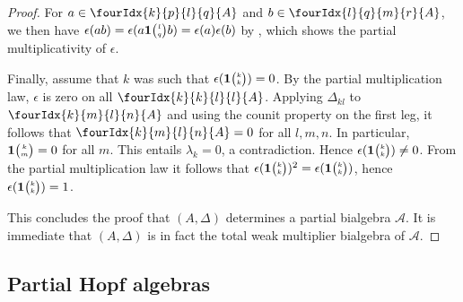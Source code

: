 \documentclass[10pt]{article}
\newcommand{\Grt}[3]{#1{\tiny {\begin{pmatrix} #2\\#3\end{pmatrix}}}}
\newcommand{\UnitC}[2]{\Grt{\mathbf{1}}{#1}{#2}}
\newcommand{\Gr}[5]{\fourIdx{#2}{#4}{#3}{#5}{#1}}%
\newcommand{\wmult}{\cdot}
\newcommand{\bmult}{*}
\theoremstyle{definition}
\numberwithin{equation}{section}
\begin{document}
\begin{proof}
For $a\in \Gr{A}{k}{l}{p}{q}$ and $b\in \Gr{A}{l}{m}{q}{r}$, we then have $\epsilon(ab) = \epsilon(a\UnitC{l}{q}b) = \epsilon(a)\epsilon(b)$ by \cite[Proposition 2.6.(4)]{Boh1}, which shows the partial multiplicativity of $\epsilon$. 

Finally, assume that $k$ was such that $\epsilon(\UnitC{k}{k})=0$. By the partial multiplication law, $\epsilon$ is zero on all $\Gr{A}{k}{l}{k}{l}$. Applying $\Delta_{kl}$ to $\Gr{A}{k}{l}{m}{n}$ and using the counit property on the first leg, it follows that $\Gr{A}{k}{l}{m}{n}=0$ for all $l,m,n$. In particular, $\UnitC{k}{m}=0$ for all $m$. This entails $\lambda_k=0$, a contradiction. Hence $\epsilon(\UnitC{k}{k})\neq 0$. From the partial multiplication law it follows that $\epsilon(\UnitC{k}{k})^2 = \epsilon(\UnitC{k}{k})$, hence $\epsilon(\UnitC{k}{k})=1$.

This concludes the proof that $(A,\Delta)$ determines a partial bialgebra $\mathscr{A}$. It is immediate that $(A,\Delta)$ is in fact the total weak multiplier bialgebra of $\mathscr{A}$. 
\end{proof} 


\subsection{Partial Hopf algebras}


\end{document}
